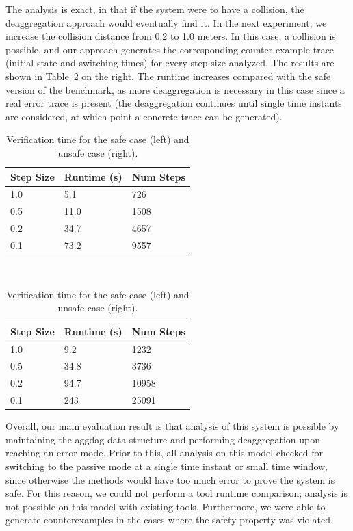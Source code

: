 The analysis is exact, in that if the system were to have a collision, the deaggregation approach would eventually find it.
%
In the next experiment, we increase the collision distance from 0.2 to 1.0 meters.
%
In this case, a collision is possible, and our approach generates the corresponding counter-example trace (initial state and switching times)
for every step size analyzed.
%
The results are shown in Table~\ref{tab:runtime} on the right.
%
The runtime increases compared with the safe version of the benchmark, as more deaggregation is necessary in this case since a real error trace is
present (the deaggregation continues until single time instants are considered, at which point a concrete trace can be generated).

\setlength{\tabcolsep}{2pt}
\begin{table}[t]
\caption{Verification time for the safe case (left) and unsafe case (right).}
\label{tab:runtime}
\centering
\setlength{\aboverulesep}{0.0pt}
\setlength{\belowrulesep}{0.0pt}
\setlength{\extrarowheight}{.0ex}
\begin{tabular}{@{}lll@{}}
  \toprule
  Step Size & Runtime (s) & Num Steps \\
  \midrule
  1.0 & 5.1 & 726 \\
  0.5 & 11.0 & 1508 \\
  0.2 & 34.7 & 4657 \\
  0.1 & 73.2 & 9557 \\
\bottomrule
\end{tabular}
~~~~~~~~
\begin{tabular}{@{}lll@{}}
  \toprule
  Step Size & Runtime (s) & Num Steps \\
  \midrule
  1.0 & 9.2 & 1232 \\
  0.5 & 34.8 & 3736 \\
  0.2 & 94.7 & 10958 \\
  0.1 & 243 & 25091 \\
\bottomrule
\end{tabular}
\end{table}

Overall, our main evaluation result is that analysis of this system is possible by maintaining the aggdag data structure and
performing deaggregation upon reaching an error mode.
%
Prior to this, all analysis on this model checked for switching to the passive mode at a single time instant or small time window, since otherwise the methods would have too much error to prove the system is safe.
%
For this reason, we could not perform a tool runtime comparison; analysis is not possible on this model with existing tools.
%
Furthermore, we were able to generate counterexamples in the cases where the safety property was violated.
